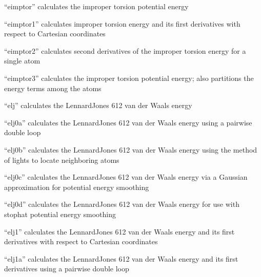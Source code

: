 \documentclass[letterpaper,11pt,english]{sphinxmanual}
\begin{document}
“eimptor” calculates the improper torsion potential energy


“eimptor1” calculates improper torsion energy and its first derivatives with respect to Cartesian coordinates


“eimptor2” calculates second derivatives of the improper torsion energy for a single atom


“eimptor3” calculates the improper torsion potential energy; also partitions the energy terms among the atoms


“elj” calculates the Lennard\sphinxhyphen{}Jones 6\sphinxhyphen{}12 van der Waals energy


“elj0a” calculates the Lennard\sphinxhyphen{}Jones 6\sphinxhyphen{}12 van der Waals energy using a pairwise double loop


“elj0b” calculates the Lennard\sphinxhyphen{}Jones 6\sphinxhyphen{}12 van der Waals energy using the method of lights to locate neighboring atoms


“elj0c” calculates the Lennard\sphinxhyphen{}Jones 6\sphinxhyphen{}12 van der Waals energy via a Gaussian approximation for potential energy smoothing


“elj0d” calculates the Lennard\sphinxhyphen{}Jones 6\sphinxhyphen{}12 van der Waals energy for use with stophat potential energy smoothing


“elj1” calculates the Lennard\sphinxhyphen{}Jones 6\sphinxhyphen{}12 van der Waals energy and its first derivatives with respect to Cartesian coordinates


“elj1a” calculates the Lennard\sphinxhyphen{}Jones 6\sphinxhyphen{}12 van der Waals energy and its first derivatives using a pairwise double loop

\end{document}
